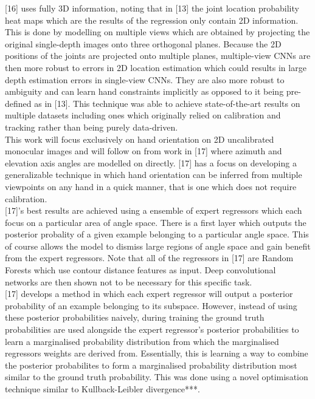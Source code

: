 \documentclass{article}
\begin{document}
[16] uses fully 3D information, noting that in [13] the joint location probability heat maps which are the results of the regression only contain 2D information. This is done by modelling on multiple views which are obtained by projecting the original single-depth images onto three orthogonal planes. Because the 2D positions of the joints are projected onto multiple planes, multiple-view CNNs are then more robust to errors in 2D location estimation which could results in large depth estimation errors in single-view CNNs. They are also more robust to ambiguity and can learn hand constraints implicitly as opposed to it being pre-defined as in [13]. This technique was able to achieve state-of-the-art results on multiple datasets including ones which originally relied on calibration and tracking rather than being purely data-driven.\\

This work will focus exclusively on hand orientation on 2D uncalibrated monocular images and will follow on from work in [17] where azimuth and elevation axis angles are modelled on directly. [17] has a focus on developing a generalizable technique in which hand orientation can be inferred from multiple viewpoints on any hand in a quick manner, that is one which does not require calibration.\\

[17]'s best results are achieved using a ensemble of expert regressors which each focus on a particular area of angle space.  There is a first layer which outputs the posterior probality of a given example belonging to a particular angle space. This of course allows the model to dismiss large regions of angle space and gain benefit from the expert regressors. Note that all of the regressors in [17] are Random Forests which use contour distance features as input. Deep convolutional networks are then shown not to be necessary for this specific task.\\

[17] develops a method in which each expert regressor will output a posterior probability of an example belonging to its subspace. However, instead of using these posterior probabilities naively, during training the ground truth probabilities are used alongside the expert regressor's posterior probabilities to learn a marginalised probability distribution from which the marginalised regressors weights are derived from. Essentially, this is learning a way to combine the  posterior probabilites to form a marginalised probability distribution most similar to the ground truth probability. This was done using a novel optimisation technique similar to  Kullback-Leibler divergence***.\\
\end{document}
